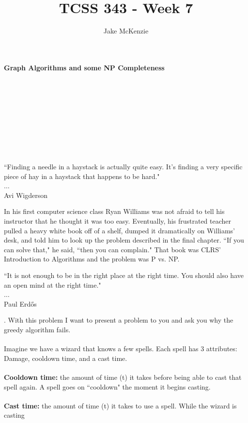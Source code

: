 \documentclass[12pt]{article}
\begin{document}
\title{TCSS 343 - Week 7}
\author{Jake McKenzie}
\maketitle
\noindent\centerline{\textbf{Graph Algorithms and some NP Completeness}}\\\\\\\\\\\\\\\\
\begin{center}
    ``Finding a needle in a haystack is actually quite easy. It's finding a very specific piece of hay in a haystack that happens to be hard." \\$\dots$\\ Avi Wigderson
\end{center}
\begin{center}
    In his first computer science class Ryan Williams was not afraid to tell his instructor that he thought it was too easy. Eventually, his frustrated teacher pulled a heavy white book off of a shelf, dumped it dramatically on Williams' desk, and told him to look up the problem described in the final chapter. ``If you can solve that," he said, ``then you can complain." That book was CLRS' Introduction to Algorithms and the problem was P vs. NP.
\end{center}
\begin{center}
    ``It is not enough to be in the right place at the right time. You should also have an open mind at the right time." \\$\dots$\\ Paul Erd\H{o}s
\end{center}
\newpage
{}. With this problem I want to present a 
problem to you and ask you why the greedy algorithm fails.\\\\
Imagine we have a wizard that knows a few spells. 
Each spell has 3 attributes: Damage, cooldown time, and a cast time. \\\\
\textbf{Cooldown time:} the amount of time (t) it takes 
before being able to cast that spell again. 
A spell goes on ``cooldown" the moment it begins casting.\\\\
\textbf{Cast time:} the amount of time (t) it takes 
to use a spell. While the wizard is casting 
\end{document}
